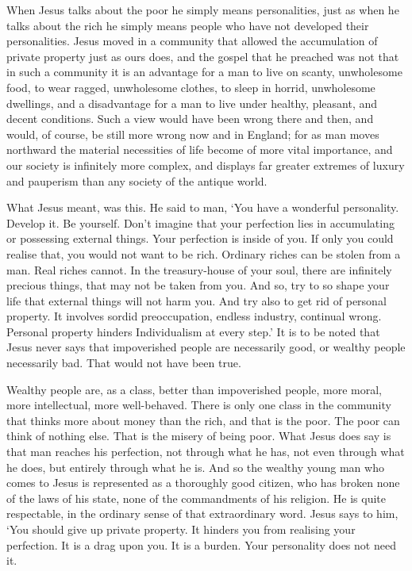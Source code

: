 When Jesus talks about the poor he simply means personalities, just as when he talks about the rich he simply means people who have not developed their personalities. Jesus moved in a community that allowed the accumulation of private property just as ours does, and the gospel that he preached was not that in such a community it is an advantage for a man to live on scanty, unwholesome food, to wear ragged, unwholesome clothes, to sleep in horrid, unwholesome dwellings, and a disadvantage for a man to live under healthy, pleasant, and decent conditions. Such a view would have been wrong there and then, and would, of course, be still more wrong now and in England; for as man moves northward the material necessities of life become of more vital importance, and our society is infinitely more complex, and displays far greater extremes of luxury and pauperism than any society of the antique world.\par

What Jesus meant, was this. He said to man, ‘You have a wonderful personality. Develop it. Be yourself. Don’t imagine that your perfection lies in accumulating or possessing external things. Your perfection is inside of you. If only you could realise that, you would not want to be rich. Ordinary riches can be stolen from a man. Real riches cannot. In the treasury-house of your soul, there are infinitely precious things, that may not be taken from you. And so, try to so shape your life that external things will not harm you. And try also to get rid of personal property. It involves sordid preoccupation, endless industry, continual wrong. Personal property hinders Individualism at every step.’ It is to be noted that Jesus never says that impoverished people are necessarily good, or wealthy people necessarily bad. That would not have been true.\par

Wealthy people are, as a class, better than impoverished people, more moral, more intellectual, more well-behaved. There is only one class in the community that thinks more about money than the rich, and that is the poor. The poor can think of nothing else. That is the misery of being poor. What Jesus does say is that man reaches his perfection, not through what he has, not even through what he does, but entirely through what he is. And so the wealthy young man who comes to Jesus is represented as a thoroughly good citizen, who has broken none of the laws of his state, none of the commandments of his religion. He is quite respectable, in the ordinary sense of that extraordinary word. Jesus says to him, ‘You should give up private property. It hinders you from realising your perfection. It is a drag upon you. It is a burden. Your personality does not need it.\par

